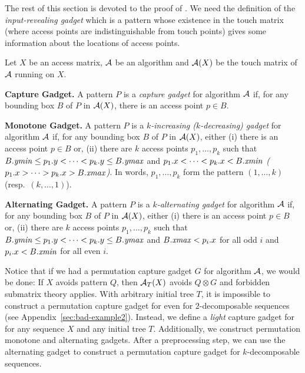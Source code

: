The rest of this section is devoted to the proof of .
We need the definition of the \emph{input-revealing gadget} which is a pattern
whose existence in the touch matrix (where access points are indistinguishable from touch
points) gives some information about the locations of access points.
\begin{definition}
	\label{def:gadget}Let $X$ be an access matrix, ${\mathcal{A}}$ be
	an algorithm and ${\mathcal{A}}(X)$ be the touch matrix of ${\mathcal{A}}$ running on
	$X$. 
	\begin{compactenum}[--]
		\item {\bf Capture Gadget.} A pattern $P$ is a \emph{capture gadget }for algorithm
		${\mathcal{A}}$ if, for any bounding box $B$ of $P$ in ${\mathcal{A}}(X)$, there is
		an access point $p\in B$.
		\item {\bf Monotone Gadget.} A pattern $P$ is a \emph{$k$-increasing ($k$-decreasing)
			gadget }for algorithm ${\mathcal{A}}$ if, for any bounding box $B$ of $P$
		in ${\mathcal{A}}(X)$, either (i) there is an access point $p\in B$ or, (ii)
		there are $k$ access points $p_{1},\dots,p_{k}$ such that $B.\mathit{ymin} \le p_{1}.y<\dots<p_{k}.y\le B.\mathit{ymax}$
		and $p_{1}.x<\dots<p_{k}.x<B.\mathit{xmin}$ \emph{(}$p_{1}.x>\dots>p_{k}.x>B.\mathit{xmax}$\emph{)}.
		In words, $p_{1},\dots,p_{k}$ form the pattern $(1,\dots,k)$ (resp.\ $(k,\dots,1)$).
		\item {\bf Alternating Gadget.} A pattern $P$ is a \emph{$k$-alternating gadget
		}for algorithm ${\mathcal{A}}$ if, for any bounding box $B$ of $P$ in ${\mathcal{A}}(X)$,
		either (i) there is an access point $p\in B$ or, (ii) there are $k$
		access points $p_{1},\dots,p_{k}$ such that $B.\mathit{ymin} \le p_{1}.y<\dots<p_{k}.y\le B.\mathit{ymax}$
		and $B.\mathit{xmax}<p_{i}.x$ for all odd $i$ and $p_{i}.x<B.\mathit{xmin}$ for all
		even $i$.
	\end{compactenum}
\end{definition}

Notice that if we had a permutation capture gadget $G$ for algorithm ${\mathcal{A}}$, we would be done: If $X$ avoids pattern $Q$, then ${\mathcal{A}}_T(X)$ avoids $Q \otimes G$ and forbidden submatrix theory applies. With arbitrary initial tree $T$, it is impossible to construct a permutation capture gadget for \greedy even for $2$-decomposable sequences (see Appendix~\ref{sec:bad-example2}). Instead, we define a \emph{light} capture gadget for \greedy for any sequence $X$ and any initial tree $T$. Additionally, we construct permutation monotone and alternating gadgets. After a preprocessing step, we can use the alternating gadget to construct a permutation capture gadget for $k$-decomposable sequences.

